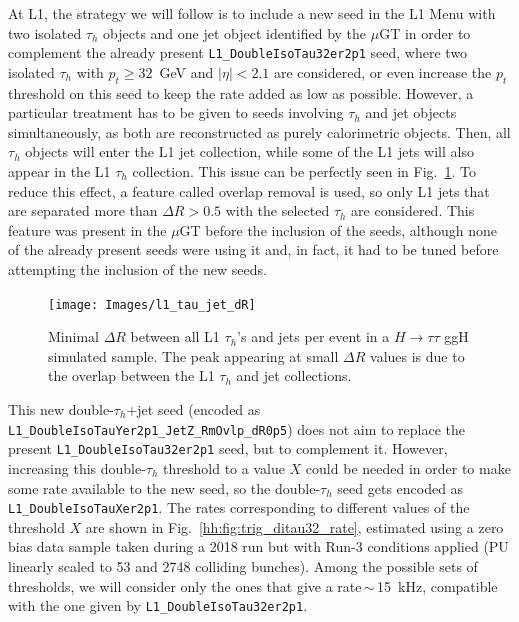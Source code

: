 \documentclass[../main.tex]{subfiles}
\begin{document}
At L1, the strategy we will follow is to include a new seed in the L1 Menu with two isolated $\tau_h$ objects and one jet object identified by the $\mu$GT in order to complement the already present \texttt{L1\_DoubleIsoTau32er2p1} seed, where two isolated $\tau_h$ with $p_t\geq32$~GeV and $|\eta|<2.1$ are considered, or even increase the $p_t$ threshold on this seed to keep the rate added as low as possible. However, a particular treatment has to be given to seeds involving $\tau_h$ and jet objects simultaneously, as both are reconstructed as purely calorimetric objects. Then, all $\tau_h$ objects will enter the L1 jet collection, while some of the L1 jets will also appear in the L1 $\tau_h$ collection. This issue can be perfectly seen in Fig.~\ref{hh:fig:l1_tau_jet_dR}. To reduce this effect, a feature called overlap removal \cite{intro:l1_13tev} is used, so only L1 jets that are separated more than $\Delta R>0.5$ with the selected $\tau_h$ are considered. This feature was present in the $\mu$GT before the inclusion of the seeds, although none of the already present seeds were using it and, in fact, it had to be tuned before attempting the inclusion of the new seeds.

\begin{figure}[h!]
\begin{center}
\texttt{[image: Images/l1\_tau\_jet\_dR]}
\end{center}
\caption{Minimal $\Delta R$ between all L1 $\tau_h$'s and jets per event in a $H\to\tau\tau$ ggH simulated sample. The peak appearing at small $\Delta R$ values is due to the overlap between the L1 $\tau_h$ and jet collections.}
\label{hh:fig:l1_tau_jet_dR}
\end{figure}

This new double-$\tau_h$+jet seed (encoded as \texttt{L1\_Double\-IsoTauY\-er2p1\-\_JetZ\_RmOvlp\_dR0p5}) does not aim to replace the present \texttt{L1\_Double\-Iso\-Tau32er2p1} seed, but to complement it. However, increasing this double-$\tau_h$ threshold to a value $X$ could be needed in order to make some rate available to the new seed, so the double-$\tau_h$ seed gets encoded as \texttt{L1\_Double\-Iso\-TauXer2p1}. The rates corresponding to different values of the threshold $X$ are shown in Fig.~\ref{hh:fig:trig_ditau32_rate}, estimated using a zero bias data sample taken during a 2018 run but with Run-3 conditions applied (PU linearly scaled to 53 and 2748 colliding bunches). Among the possible sets of thresholds, we will consider only the ones that give a rate\,$\sim$\,15~kHz, compatible with the one given by \texttt{L1\_Double\-Iso\-Tau32er2p1}.
\end{document}

